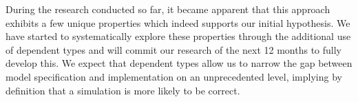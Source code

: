 \documentclass[oneside]{book}
\begin{document}
During the research conducted so far, it became apparent that this approach exhibits a few unique properties which indeed supports our initial hypothesis. We have started to systematically explore these properties through the additional use of dependent types and will commit our research of the next 12 months to fully develop this. We expect that dependent types allow us to narrow the gap between model specification and implementation on an unprecedented level, implying by definition that a simulation is more likely to be correct.

\clearpage
\tableofcontents
\clearpage















%

\renewcommand\bibname{References}





\end{document}
